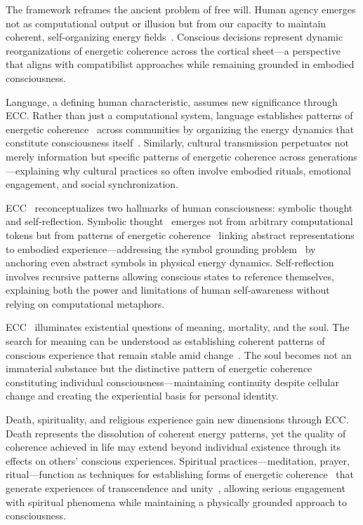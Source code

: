 The framework reframes the ancient problem of free will. Human agency emerges not as computational output or illusion but from our capacity to maintain coherent, self-organizing energy fields~\cite{Beebee2013}. Conscious decisions represent dynamic reorganizations of energetic coherence across the cortical sheet—a perspective that aligns with compatibilist approaches while remaining grounded in embodied consciousness.

Language, a defining human characteristic, assumes new significance through ECC. Rather than just a computational system, language establishes patterns of energetic coherence~ across communities by organizing the energy dynamics that constitute consciousness itself~\cite{Bruner1990}. Similarly, cultural transmission perpetuates not merely information but specific patterns of energetic coherence across generations—explaining why cultural practices so often involve embodied rituals, emotional engagement, and social synchronization.

ECC~ reconceptualizes two hallmarks of human consciousness: symbolic thought~ and self-reflection. Symbolic thought~ emerges not from arbitrary computational tokens but from patterns of energetic coherence~ linking abstract representations to embodied experience—addressing the symbol grounding problem~ by anchoring even abstract symbols in physical energy dynamics. Self-reflection involves recursive patterns allowing conscious states to reference themselves, explaining both the power and limitations of human self-awareness without relying on computational metaphors.

ECC~ illuminates existential questions of meaning, mortality, and the soul. The search for meaning can be understood as establishing coherent patterns of conscious experience that remain stable amid change~\cite{Camus1955}. The soul becomes not an immaterial substance but the distinctive pattern of energetic coherence~ constituting individual consciousness—maintaining continuity despite cellular change and creating the experiential basis for personal identity.

Death, spirituality, and religious experience gain new dimensions through ECC. Death represents the dissolution of coherent energy patterns, yet the quality of coherence achieved in life may extend beyond individual existence through its effects on others' conscious experiences. Spiritual practices—meditation, prayer, ritual—function as techniques for establishing forms of energetic coherence~ that generate experiences of transcendence and unity~\cite{Newberg2010}, allowing serious engagement with spiritual phenomena while maintaining a physically grounded approach to consciousness.

